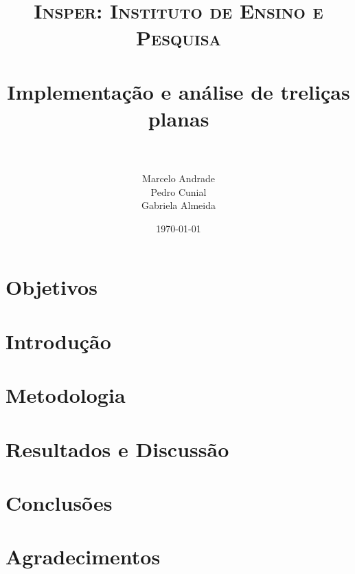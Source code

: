 \documentclass[paper=a4, fontsize=11pt]{scrartcl}
\title{
		\usefont{OT1}{bch}{b}{n}
		\normalfont \normalsize \textsc{Insper: Instituto de Ensino e Pesquisa} \\ [25pt] %
		\horrule{0.5pt} \\[0.4cm]														  
		\huge Implementação e análise de treliças planas \\			%
		\horrule{2pt} \\[0.5cm]
}
\author{										%
		\normalfont 								\normalsize
        Marcelo Andrade\\[-3pt]		\normalsize
		Pedro Cunial\\[-3pt]		\normalsize
        Gabriela Almeida\\[-3pt]		\normalsize
}
\date{\today}
\begin{document}
	
\maketitle

\newpage

\tableofcontents

\newpage


\section{Objetivos}

\section{Introdução}

\section{Metodologia}

\section{Resultados e Discussão}

\section{Conclusões}

\section{Agradecimentos}

{}


\end{document}
